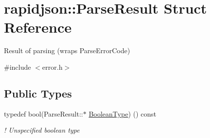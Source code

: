 \hypertarget{structrapidjson_1_1_parse_result}{}\section{rapidjson\+::Parse\+Result Struct Reference}
\label{structrapidjson_1_1_parse_result}


Result of parsing (wraps Parse\+Error\+Code)  




{\ttfamily \#include $<$error.\+h$>$}

\subsection*{Public Types}
\begin{DoxyCompactItemize}
\item 
typedef bool(Parse\+Result\+::$\ast$ \mbox{\hyperlink{structrapidjson_1_1_parse_result_aff2daa285445bba8f76578ea274e34a3}{Boolean\+Type}}) () const
\begin{DoxyCompactList}\small\item\em ! Unspecified boolean type \end{DoxyCompactList}\end{DoxyCompactItemize}
